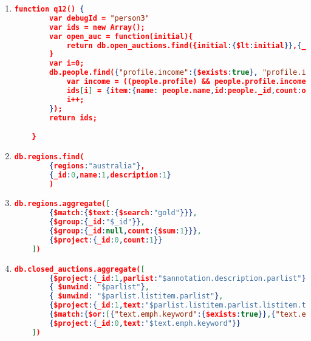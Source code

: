 \begin{enumerate}[label=Q\arabic*.]
\begin{lstlisting}[language=JSON,   basicstyle=\scriptsize]
    	var i=0;
    	db.people.find({},{_id:1, name:1,"profile.income":1}).forEach(function(people){
    		var income = ((people.profile) && people.profile.income)? people.profile.income/5000:0;
    		ids[i] = {item:{name: people.name,id:people._id,count:open_auc(income)}};
    		i++;
    	});
    	return ids;
        }
	\end{lstlisting}
	
	
    \item %
	\begin{lstlisting}[language=JSON,   basicstyle=\scriptsize]
	   function q12() {
    	var debugId = "person3"
    	var ids = new Array();
    	var open_auc = function(initial){
    		return db.open_auctions.find({initial:{$lt:initial}},{_id:1}).count();
    	}
    	var i=0;
    	db.people.find({"profile.income":{$exists:true}, "profile.income":{$gt:50000}},{_id:1, name:1,"profile.income":1}).forEach(function(people){
    		var income = ((people.profile) && people.profile.income)? people.profile.income/5000:0;
    		ids[i] = {item:{name: people.name,id:people._id,count:open_auc(income)}};
    		i++;
    	});
    	return ids;

    }
	\end{lstlisting}
	
	\item %
	\begin{lstlisting}[language=JSON,   basicstyle=\scriptsize]
	    db.regions.find(
		{regions:"australia"},
		{_id:0,name:1,description:1}
        )
	\end{lstlisting}
	
    \item %
	\begin{lstlisting}[language=JSON,   basicstyle=\scriptsize]
	  db.regions.aggregate([
		{$match:{$text:{$search:"gold"}}},
		{$group:{_id:"$_id"}},
		{$group:{_id:null,count:{$sum:1}}},
		{$project:{_id:0,count:1}}
	])
	\end{lstlisting}
	
    \item %
	\begin{lstlisting}[language=JSON,   basicstyle=\scriptsize]
	 db.closed_auctions.aggregate([
		{$project:{_id:1,parlist:"$annotation.description.parlist"}},
		{ $unwind: "$parlist"},
		{ $unwind: "$parlist.listitem.parlist"},
		{$project:{_id:1,text:"$parlist.listitem.parlist.listitem.text"}},
		{$match:{$or:[{"text.emph.keyword":{$exists:true}},{"text.emph.keyword.childtext":{$exists:true}},{"text.emph.keyword.child":{$exists:true}}]}},
		{$project:{_id:0,text:"$text.emph.keyword"}}
	])
	\end{lstlisting}
	

\end{enumerate}
